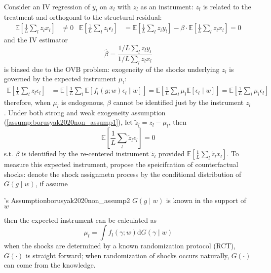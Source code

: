 \documentclass[twoside]{article}
\begin{document}
Consider an IV regression of $y_l$ on $x_l$ with $z_l$ as an instrument: $z_l$ is related to the treatment and orthogonal to the structural residual:
\begin{align*}
    \mathbb{E}\left[\frac{1}{L}\sum_l z_lx_l\right]&\neq 0 & \mathbb{E}\left[\frac{1}{L}\sum_lz_l\epsilon_l\right] &= \mathbb{E}\left[\frac{1}{L}\sum_l z_ly_l\right] - \beta \cdot \mathbb{E}\left[\frac{1}{L} \sum_lz_l x_l \right] =0 
\end{align*}
and the IV estimator
\begin{equation*}
    \hat{\beta} = \frac{1/L \sum_lz_ly_l}{1/L \sum_l z_l x_l}
\end{equation*}
is biased due to the OVB problem: exogeneity of the shocks underlying $z_l$ is governed by the expected instrument $\mu_l$: 
\begin{align*}
    \mathbb{E}\left[\frac{1}{L}\sum_l z_l\epsilon_l\right] &= \mathbb{E}\left[\frac{1}{L}\sum_l \mathbb{E}\left[f_l(g;w)\epsilon_l\mid w\right]\right] = \mathbb{E}\left[\frac{1}{L}\sum_l\mu_l \mathbb{E}\left[\epsilon_l\mid w\right]\right] = \mathbb{E}\left[\frac{1}{L}\sum_l \mu_l\epsilon_l\right]
\end{align*}
therefore, when $\mu_l$ is endogenous, $\beta$ cannot be identified just by the instrument $z_l$.
Under both strong and weak exogeneity assumption (\ref{assump:borusyak2020non_assump1}), let $\tilde{z}_l = z_l-\mu_l$, then $$ \mathbb{E}\left[\frac{1}{L}\sum_l \tilde{z}_l \epsilon_l \right] =0 $$
s.t. $\beta$ is identified by the re-centered instrument $\tilde{z}_l$ provided $\mathbb{E}\left[\frac{1}{L}\sum_l \tilde{z}_l x_l \right]$. To measure this expected instrument, \citet{borusyak2020non} propose the speicifcation of counterfactual shocks:
denote the shock assignmetn process by the conditional distribution of $G(g\mid w)$, if assume 
\begin{assumption}{\citet{borusyak2020non}'s Assumption}{borusyak2020non_assump2}
    $G(g\mid w)$ is known in the support of $w$
\end{assumption}
then the expected instrument can be calculated as $$ \mu_l = \int f_l \left(\gamma;w\right)\mathrm{d}G(\gamma \mid w) $$
when the shocks are determined by a known randomization protocol (RCT), $G(\cdot)$ is straight forward; when randomization of shocks occurs naturally, $G(\cdot)$ can come from the knowledge.

\newpage


\end{document}
